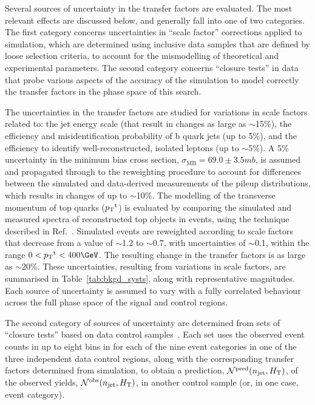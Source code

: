 Several sources of uncertainty in the transfer factors are evaluated.
The most relevant effects are discussed below, and generally fall into
one of two categories. The first category concerns uncertainties in
``scale factor'' corrections applied to simulation, which are
determined using inclusive data samples that are defined by loose
selection criteria, to account for the mismodelling of theoretical and
experimental parameters. The second category concerns ``closure
tests'' in data that probe various aspects of the accuracy of the
simulation to model correctly the transfer factors in the phase space
of this search.

The uncertainties in the transfer factors are studied for variations
in scale factors related to: the jet energy scale (that result in
changes as large as $\sim$15\%), the efficiency and misidentification
probability of b quark jets (up to 5\%), and the efficiency to
identify well-reconstructed, isolated leptons (up to $\sim$5\%). A 5\%
uncertainty in the minimum bias cross section, $\sigma_\text{MB} =
69.0 \pm 3.5\unit{mb}$, is assumed and propagated through to the
reweighting procedure to account for differences between the simulated
and data-derived measurements of the pileup distributions, which
results in changes of up to $\sim$10\%. The modelling of the
transverse momentum of top quarks (${p_{\text T}}^\text{t}$) is evaluated by
comparing the simulated and measured \Pt spectra of reconstructed top
objects in \ttbar events, using the technique described in
Ref.~\cite{}. Simulated events are reweighted according to scale
factors that decrease from a value of $\sim$1.2 to $\sim$0.7, with
uncertainties of $\sim$0.1, within the range $0 < \Pt^\text{t} <
400\GeV$. The resulting change in the transfer factors is as large as
$\sim$20\%. These uncertainties, resulting from variations in scale
factors, are summarised in Table~\ref{tab:bkgd_systs}, along with
representative magnitudes. Each source of uncertainty is assumed to
vary with a fully correlated behaviour across the full phase space of
the signal and control regions.

The second category of sources of uncertainty are determined from sets
of ``closure tests'' based on data control
samples~\cite{RA1Paper2012}. Each set uses the observed event counts
in up to eight bins in \scalht for each of the nine \njet event
categories in one of the three independent data control regions, along
with the corresponding transfer factors determined from simulation, to
obtain a prediction, $\mathcal{N}^\text{pred}(n_{\text{jet}}, H_{\mathrm{T}})$, of the
observed yields, $\mathcal{N}^\text{obs}(n_{\text{jet}}, H_{\mathrm{T}})$, in another
control sample (or, in one case, \nb event category).


